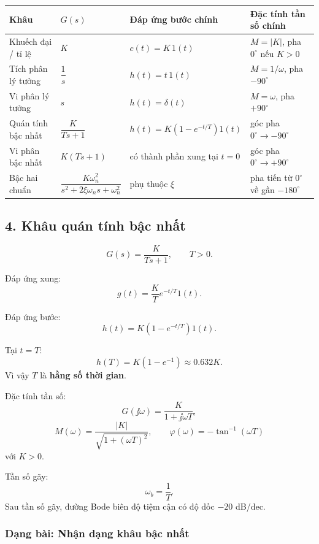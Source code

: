 \begin{center}
\scriptsize
\renewcommand{\arraystretch}{1.4}
\begin{tabular}{|p{}|p{}|p{}|p{}|}
\hline
\textbf{Khâu} & \textbf{$G(s)$} & \textbf{Đáp ứng bước chính} & \textbf{Đặc tính tần số chính}\\
\hline
Khuếch đại / tỉ lệ & $K$ & $c(t)=K\,1(t)$ & $M=|K|$, pha $0^\circ$ nếu $K>0$\\
\hline
Tích phân lý tưởng & $\dfrac1s$ & $h(t)=t\,1(t)$ & $M=1/\omega$, pha $-90^\circ$\\
\hline
Vi phân lý tưởng & $s$ & $h(t)=\delta(t)$ & $M=\omega$, pha $+90^\circ$\\
\hline
Quán tính bậc nhất & $\dfrac{K}{Ts+1}$ & $h(t)=K(1-e^{-t/T})1(t)$ & góc pha $0^\circ\to-90^\circ$\\
\hline
Vi phân bậc nhất & $K(Ts+1)$ & có thành phần xung tại $t=0$ & góc pha $0^\circ\to+90^\circ$\\
\hline
Bậc hai chuẩn & $\dfrac{K\omega_n^2}{s^2+2\xi\omega_ns+\omega_n^2}$ & phụ thuộc $\xi$ & pha tiến từ $0^\circ$ về gần $-180^\circ$\\
\hline
\end{tabular}
\renewcommand{\arraystretch}{1}
\end{center}

\subsection*{4. Khâu quán tính bậc nhất}

\[
\boxed{G(s)=\frac{K}{Ts+1}},\qquad T>0.
\]

Đáp ứng xung:
\[
\boxed{g(t)=\frac{K}{T}e^{-t/T}1(t)}.
\]

Đáp ứng bước:
\[
\boxed{h(t)=K(1-e^{-t/T})1(t)}.
\]

Tại $t=T$:
\[
h(T)=K(1-e^{-1})\approx0.632K.
\]
Vì vậy $T$ là \textbf{hằng số thời gian}.

Đặc tính tần số:
\[
G(\jj\omega)=\frac{K}{1+\jj\omega T},
\]
\[
\boxed{
M(\omega)=\frac{|K|}{\sqrt{1+(\omega T)^2}},
\qquad
\varphi(\omega)=-\tan^{-1}(\omega T)
}
\]
với $K>0$.

Tần số gãy:
\[
\boxed{\omega_b=\frac1T}.
\]
Sau tần số gãy, đường Bode biên độ tiệm cận có độ dốc $-20$ dB/dec.

\subsubsection*{Dạng bài: Nhận dạng khâu bậc nhất}

